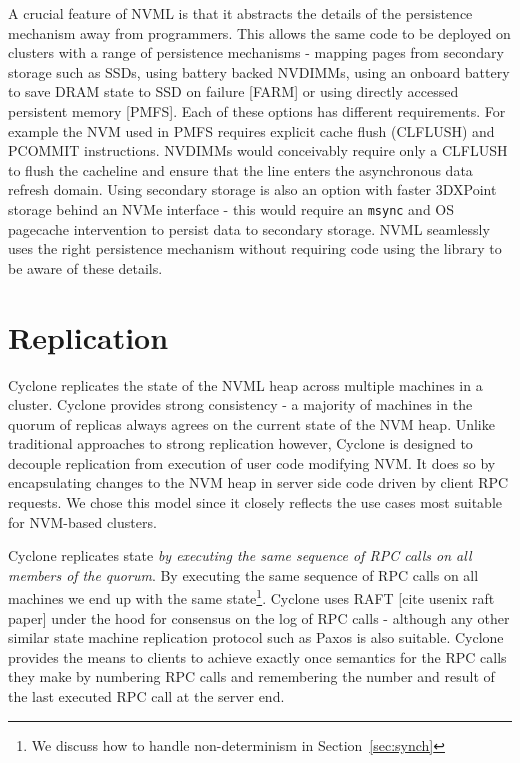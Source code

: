\documentclass[twocolumn]{article}
\begin{document}
A crucial feature of NVML is that it abstracts the details of the persistence
mechanism away from programmers. This allows the same code to be deployed on
clusters with a range of persistence mechanisms - mapping pages from secondary
storage such as SSDs, using battery backed NVDIMMs, using an onboard battery to
save DRAM state to SSD on failure [FARM] or using directly accessed persistent
memory [PMFS]. Each of these options has different requirements. For example the
NVM used in PMFS requires explicit cache flush (CLFLUSH) and PCOMMIT
instructions. NVDIMMs would conceivably require only a CLFLUSH to flush the
cacheline and ensure that the line enters the asynchronous data refresh
domain. Using secondary storage is also an option with faster 3DXPoint storage
behind an NVMe interface - this would require an {\tt msync} and OS pagecache
intervention to persist data to secondary storage. NVML seamlessly uses the
right persistence mechanism without requiring code using the library to be aware
of these details.

\section{Replication}
Cyclone replicates the state of the NVML heap across multiple machines in a
cluster. Cyclone provides strong consistency - a majority of machines in the
quorum of replicas always agrees on the current state of the NVM heap. Unlike
traditional approaches to strong replication however, Cyclone is designed to
decouple replication from execution of user code modifying NVM. It does so by
encapsulating changes to the NVM heap in server side code driven by client RPC
requests. We chose this model since it closely reflects the use cases most
suitable for NVM-based clusters.

Cyclone replicates state \emph{by executing the same sequence of RPC calls on
  all members of the quorum}. By executing the same sequence of RPC calls on all
machines we end up with the same state\footnote{We discuss how to handle
  non-determinism in Section~\ref{sec:synch}}. Cyclone uses RAFT [cite usenix
  raft paper] under the hood for consensus on the log of RPC calls - although
any other similar state machine replication protocol such as
Paxos is also suitable. Cyclone provides the means to clients to achieve exactly
once semantics for the RPC calls they make by numbering RPC calls and
remembering the number and result of the last executed RPC call at the server end.
\end{document}
